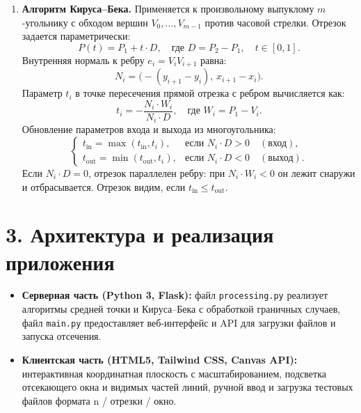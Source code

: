 \documentclass[11pt,a4paper]{article}
\begin{document}
\begin{enumerate}
    \item \textbf{Алгоритм Кируса--Бека.} Применяется к произвольному выпуклому $m$-угольнику с обходом вершин $V_0, \dots, V_{m-1}$ против часовой стрелки. Отрезок задается параметрически:
    \begin{equation}
        P(t) = P_1 + t \cdot D, \quad \text{где } D = P_2 - P_1, \quad t \in [0, 1].
    \end{equation}
    Внутренняя нормаль к ребру $e_i = V_i V_{i+1}$ равна:
    \begin{equation}
        N_i = \bigl(-(y_{i+1} - y_i), \, x_{i+1} - x_i\bigr).
    \end{equation}
    Параметр $t_i$ в точке пересечения прямой отрезка с ребром вычисляется как:
    \begin{equation}
        t_i = -\frac{N_i \cdot W_i}{N_i \cdot D}, \quad \text{где } W_i = P_1 - V_i.
    \end{equation}
    Обновление параметров входа и выхода из многоугольника:
    \begin{equation}
        \begin{cases}
            t_{\text{in}} = \max(t_{\text{in}}, t_i), & \text{если } N_i \cdot D > 0 \quad (\text{вход}), \\
            t_{\text{out}} = \min(t_{\text{out}}, t_i), & \text{если } N_i \cdot D < 0 \quad (\text{выход}).
        \end{cases}
    \end{equation}
    Если $N_i \cdot D = 0$, отрезок параллелен ребру: при $N_i \cdot W_i < 0$ он лежит снаружи и отбрасывается. Отрезок видим, если $t_{\text{in}} \le t_{\text{out}}$.
\end{enumerate}

\newpage

\section*{3. Архитектура и реализация приложения}
\begin{itemize}
    \item \textbf{Серверная часть (Python 3, Flask):} файл \texttt{processing.py} реализует алгоритмы средней точки и Кируса--Бека с обработкой граничных случаев, файл \texttt{main.py} предоставляет веб-интерфейс и API для загрузки файлов и запуска отсечения.
    \item \textbf{Клиентская часть (HTML5, Tailwind CSS, Canvas API):} интерактивная координатная плоскость с масштабированием, подсветка отсекающего окна и видимых частей линий, ручной ввод и загрузка тестовых файлов формата n / отрезки / окно.
\end{itemize}
\end{document}
